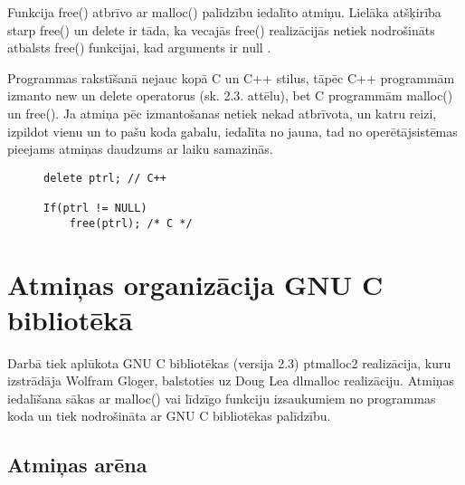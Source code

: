 Funkcija free() atbrīvo ar malloc() palīdzību iedalīto atmiņu.
Lielāka atšķirība starp free() un delete ir tāda, ka vecajās free() realizācijās netiek nodrošināts atbalsts free() funkcijai, kad arguments ir null \cite{POCF}. 

Programmas rakstīšanā nejauc kopā C un C++ stilus, tāpēc C++ programmām izmanto 
new un delete operatorus (sk. 2.3. attēlu), bet C programmām malloc() un free().
Ja atmiņa pēc izmantošanas netiek nekad atbrīvota, un katru reizi, izpildot vienu un to pašu koda gabalu, iedalīta no jauna, tad no operētājsistēmas pieejams atmiņas daudzums ar laiku samazinās.

\begin{figure}[h]
\begin{lstlisting}
delete ptrl; // C++

If(ptrl != NULL)
	free(ptrl); /* C */
\end{lstlisting}
\caption{\textbf{\fontsize{11}{12}\selectfont {Dinamiskās atmiņas atbrīvošana C un C++}}}
\end{figure}




\section{Atmiņas organizācija GNU C bibliotēkā}
Darbā tiek aplūkota GNU C bibliotēkas (versija 2.3) ptmalloc2 realizācija, kuru izstrādāja Wolfram Gloger, balstoties uz Doug Lea dlmalloc realizāciju. 
Atmiņas iedalīšana sākas ar malloc() vai līdzīgo funkciju izsaukumiem no programmas koda un tiek nodrošināta ar GNU C bibliotēkas palīdzību. 


\subsection{Atmiņas arēna}


